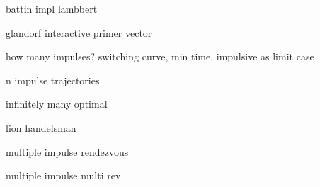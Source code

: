 battin impl lambbert \cite{battin_vaughan_elegant_lambert}

glandorf\cite{glandorf_transition_matrix}
interactive primer vector\cite{interactive_primer_vector}


how many impulses? switching curve, min time, impulsive as limit case
\cite{how_many_impulses}

n impulse trajectories\cite{efficient_n_impulse}

infinitely many optimal\cite{inf_many_optima}

lion handelsman\cite{fixed_time_primer_vector}


multiple impulse rendezvous \cite{multi_impulse_circ_rendezvous}

multiple impulse multi rev\cite{mult_rev_many_imp}